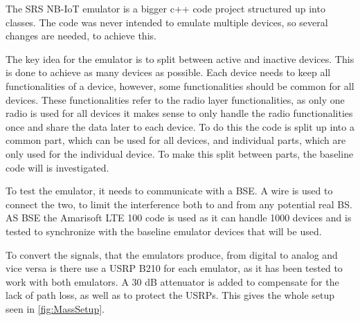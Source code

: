 The SRS NB-IoT emulator is a bigger c++ code project structured up into classes. The code was never intended to emulate multiple devices, so several changes are needed, to achieve this.



 

The key idea for the emulator is to split between active and inactive devices. This is done to achieve as many devices as possible. Each device needs to keep all functionalities of a device, however, some functionalities should be common for all devices. These functionalities refer to the radio layer functionalities, as only one radio is used for all devices it makes sense to only handle the radio functionalities once and share the data later to each device. To do this the code is split up into a common part, which can be used for all devices, and individual parts, which are only used for the individual device. To make this split between parts, the baseline code will is investigated.

To test the emulator, it needs to communicate with a BSE. A wire is used to connect the two, to limit the interference both to and from any potential real BS. AS BSE the Amarisoft LTE 100 code is used as it can handle 1000 devices \citep{Amarisoft_solutions} and is tested to synchronize with the baseline emulator devices that will be used. 

To convert the signals, that the emulators produce, from digital to analog and vice versa is there use a USRP B210 for each emulator, as it has been tested to work with both emulators. A 30 dB attenuator is added to compensate for the lack of path loss, as well as to protect the USRPs. This gives the whole setup seen in \autoref{fig:MassSetup}. 





